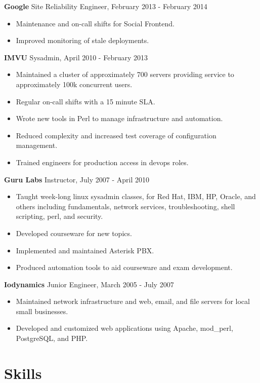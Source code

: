 \documentclass[line]{res}
\begin{document}
\begin{resume}
\textbf{Google} Site Reliability Engineer, February 2013 - February 2014
\begin{itemize}
\item Maintenance and on-call shifts for Social Frontend.
\item Improved monitoring of stale deployments.
\end{itemize}

\textbf{IMVU} Sysadmin, April 2010 - February 2013
\begin{itemize}
\item Maintained a cluster of approximately 700 servers providing service to approximately 100k concurrent users.
\item Regular on-call shifts with a 15 minute SLA.
\item Wrote new tools in Perl to manage infrastructure and automation.
\item Reduced complexity and increased test coverage of configuration management.
\item Trained engineers for production access in devops roles.
\end{itemize}

\textbf{Guru Labs} Instructor, July 2007 - April 2010
\begin{itemize}
\item Taught week-long linux sysadmin classes, for Red Hat, IBM, HP, Oracle, and others including fundamentals, network services, troubleshooting, shell scripting, perl, and security.
\item Developed courseware for new topics.
\item Implemented and maintained Asterisk PBX.
\item Produced automation tools to aid courseware and exam development.
\end{itemize}

\textbf{Iodynamics} Junior Engineer, March 2005 - July 2007
\begin{itemize}
\item Maintained network infrastructure and web, email, and file servers for local small businesses.
\item Developed and customized web applications using Apache, mod\_perl, PostgreSQL, and PHP.
\end{itemize}

\section{Skills}


\end{resume}
\end{document}
